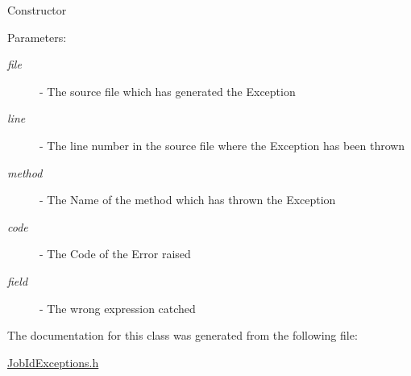 Constructor \begin{Desc}
\item[Parameters:]
\begin{description}
\item[{\em file}]- The source file which has generated the Exception \item[{\em line}]- The line number in the source file where the Exception has been thrown \item[{\em method}]- The Name of the method which has thrown the Exception \item[{\em code}]- The Code of the Error raised \item[{\em field}]- The wrong expression catched \end{description}
\end{Desc}


The documentation for this class was generated from the following file:\begin{CompactItemize}
\item 
\hyperlink{JobIdExceptions_8h}{Job\-Id\-Exceptions.h}\end{CompactItemize}
